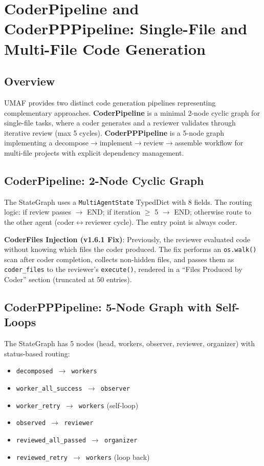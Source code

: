 \section{CoderPipeline and CoderPPPipeline: Single-File and Multi-File Code Generation}
\label{sec:coder}

\subsection{Overview}

UMAF provides two distinct code generation pipelines representing complementary approaches. \textbf{CoderPipeline} is a minimal 2-node cyclic graph for single-file tasks, where a coder generates and a reviewer validates through iterative review (max 5 cycles). \textbf{CoderPPPipeline} is a 5-node graph implementing a decompose$\rightarrow$implement$\rightarrow$review$\rightarrow$assemble workflow for multi-file projects with explicit dependency management.

\subsection{CoderPipeline: 2-Node Cyclic Graph}

The StateGraph uses a \texttt{MultiAgentState} TypedDict with 8 fields. The routing logic: if review passes $\rightarrow$ END; if iteration $\ge$ 5 $\rightarrow$ END; otherwise route to the other agent (coder$\leftrightarrow$reviewer cycle). The entry point is always coder.

\textbf{CoderFiles Injection (v1.6.1 Fix)}: Previously, the reviewer evaluated code without knowing which files the coder produced. The fix performs an \texttt{os.walk()} scan after coder completion, collects non-hidden files, and passes them as \texttt{coder\_files} to the reviewer's \texttt{execute()}, rendered in a ``Files Produced by Coder'' section (truncated at 50 entries).

\subsection{CoderPPPipeline: 5-Node Graph with Self-Loops}

The StateGraph has 5 nodes (head, workers, observer, reviewer, organizer) with status-based routing:
\begin{itemize}
    \item \texttt{decomposed $\rightarrow$ workers}
    \item \texttt{worker\_all\_success $\rightarrow$ observer}
    \item \texttt{worker\_retry $\rightarrow$ workers} (self-loop)
    \item \texttt{observed $\rightarrow$ reviewer}
    \item \texttt{reviewed\_all\_passed $\rightarrow$ organizer}
    \item \texttt{reviewed\_retry $\rightarrow$ workers} (loop back)
\end{itemize}

